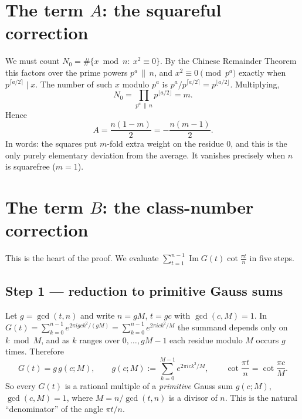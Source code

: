 \documentclass[11pt]{article}
\DeclareMathOperator{\Imag}{Im}
\begin{document}
\section{The term $A$: the squareful correction}

We must count $N_0=\#\{x\bmod n:\ x^2\equiv0\}$. By the Chinese Remainder Theorem this factors over the prime
powers $p^a\,\|\,n$, and $x^2\equiv0\pmod{p^a}$ exactly when $p^{\lceil a/2\rceil}\mid x$. The number of such $x$
modulo $p^a$ is $p^{a}/p^{\lceil a/2\rceil}=p^{\lfloor a/2\rfloor}$. Multiplying,
\[
N_0=\prod_{p^a\,\|\,n}p^{\lfloor a/2\rfloor}=m.
\]
Hence
\begin{equation}\label{eq:Aval}
A=\frac{n(1-m)}{2}=-\frac{n(m-1)}{2}.
\end{equation}
In words: the squares put $m$-fold extra weight on the residue $0$, and this is the only purely elementary
deviation from the average. It vanishes precisely when $n$ is squarefree ($m=1$).

\section{The term $B$: the class-number correction}

This is the heart of the proof. We evaluate
$\sum_{t=1}^{n-1}\Imag G(t)\cot\frac{\pi t}{n}$ in five steps.

\subsection{Step 1 --- reduction to primitive Gauss sums}
Let $g=\gcd(t,n)$ and write $n=gM$, $t=gc$ with $\gcd(c,M)=1$. In $G(t)=\sum_{k=0}^{n-1}e^{2\pi i gck^2/(gM)}
=\sum_{k=0}^{n-1}e^{2\pi i ck^2/M}$ the summand depends only on $k\bmod M$, and as $k$ ranges over
$0,\dots,gM-1$ each residue modulo $M$ occurs $g$ times. Therefore
\[
G(t)=g\,g(c;M),\qquad g(c;M):=\sum_{k=0}^{M-1}e^{2\pi i ck^2/M},\qquad
\cot\frac{\pi t}{n}=\cot\frac{\pi c}{M}.
\]
So every $G(t)$ is a rational multiple of a \emph{primitive} Gauss sum $g(c;M)$, $\gcd(c,M)=1$, where
$M=n/\gcd(t,n)$ is a divisor of $n$. This is the natural ``denominator'' of the angle $\pi t/n$.
\end{document}
